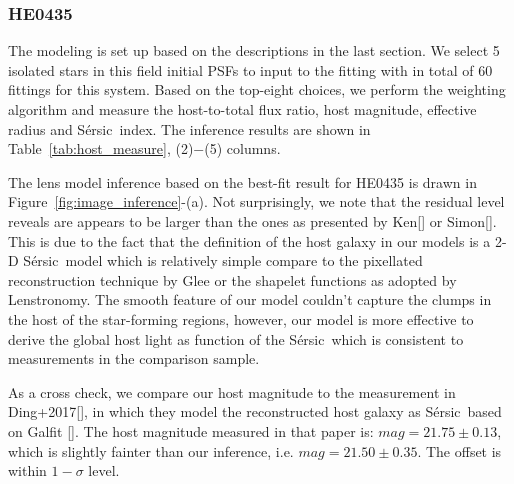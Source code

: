 \documentclass[fleqn,usenatbib]{mnras}
\newcommand{\sersic}{S\'ersic}
\newcommand{\lenstronomy}{{\sc Lenstronomy}}
\begin{document}
\subsubsection{HE0435}
The modeling is set up based on the descriptions in the last section. We select 5 isolated stars in this field initial PSFs to input to the fitting with in total of 60 fittings for this system. Based on the top-eight choices, we perform the weighting algorithm and measure the host-to-total flux ratio, host magnitude, effective radius and \sersic\ index. The inference results are shown in Table~\ref{tab:host_measure}, (2)$-$(5) columns.

The lens model inference based on the best-fit result for HE0435 is drawn in Figure~\ref{fig:image_inference}-(a). Not surprisingly, we note that the residual level reveals are appears to be larger than the ones as presented by Ken[] or Simon[]. This is due to the fact that the definition of the host galaxy in our models is a 2-D \sersic\ model which is relatively simple compare to the pixellated reconstruction technique by {\sc Glee} or the shapelet functions as adopted by \lenstronomy. The smooth feature of our model couldn't capture the clumps in the host of the star-forming regions, however, our model is more effective to derive the global host light as function of the \sersic\ which is consistent to measurements in the comparison sample. 

As a cross check, we compare our host magnitude to the measurement in Ding+2017[], in which they model the reconstructed host galaxy as \sersic\ based on Galfit []. The host magnitude measured in that paper is: $mag = 21.75 \pm 0.13$, %
which is slightly fainter than our inference, i.e. $mag = 21.50 \pm 0.35$. The offset is within $1-\sigma$ level.
\end{document}
